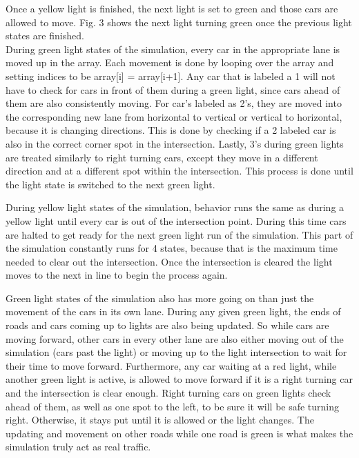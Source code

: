 \documentclass[conference]{IEEEtran}
\begin{document}
Once a yellow light is finished, the next light is set to green and those cars are allowed to move. Fig. 3 shows the next light turning green once the previous light states are finished. \\

\hspace*{.2cm} During green light states of the simulation, every car in the appropriate lane is moved up in the array. Each movement is done by looping over the array and setting indices to be array[i] = array[i+1]. Any car that is labeled a 1 will not have to check for cars in front of them during a green light, since cars ahead of them are also consistently moving. For car's labeled as 2's, they are moved into the corresponding new lane from horizontal to vertical or vertical to horizontal, because it is changing directions. This is done by checking if a 2 labeled car is also in the correct corner spot in the intersection. Lastly, 3's during green lights are treated similarly to right turning cars, except they move in a different direction and at a different spot within the intersection. This process is done until the light state is switched to the next green light. 

\hspace*{.2cm} During yellow light states of the simulation, behavior runs the same as during a yellow light until every car is out of the intersection point. During this time cars are halted to get ready for the next green light run of the simulation. This part of the simulation constantly runs for 4 states, because that is the maximum time needed to clear out the intersection. Once the intersection is cleared the light moves to the next in line to begin the process again.

\hspace*{.2cm} Green light states of the simulation also has more going on than just the movement of the cars in its own lane. During any given green light, the ends of roads and cars coming up to lights are also being updated. So while cars are moving forward, other cars in every other lane are also either moving out of the simulation (cars past the light) or moving up to the light intersection to wait for their time to move forward. Furthermore, any car waiting at a red light, while another green light is active, is allowed to move forward if it is a right turning car and the intersection is clear enough. Right turning cars on green lights check ahead of them, as well as one spot to the left, to be sure it will be safe turning right. Otherwise, it stays put until it is allowed or the light changes. The updating and movement on other roads while one road is green is what makes the simulation truly act as real traffic.
\end{document}
